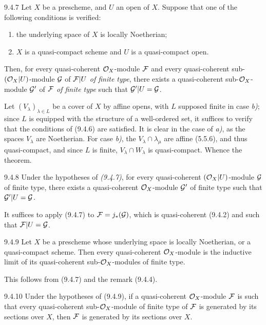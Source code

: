 \documentclass[../main.tex]{subfiles}
\begin{document}
\begin{env}[Theorem]{9.4.7}
    Let $X$ be a prescheme, and $U$ an open of $X$.
    Suppose that one of the following conditions is verified:
    \begin{enumerate}[label=\normalfont\alph*)]
        \item the underlying space of $X$ is locally Noetherian;
        \item $X$ is a quasi-compact scheme and $U$ is a quasi-compact open.
    \end{enumerate}
    Then, for every quasi-coherent $\mathcal{O}_X$-module $\mathcal{F}$ and every quasi-coherent sub-$(\mathcal{O}_X|U)$-module $\mathcal{G}$ of $\mathcal{F}|U$ \emph{of finite type}, there exists a quasi-coherent sub-$\mathcal{O}_X$-module $\mathcal{G}'$ of $\mathcal{F}$ \emph{of finite type} such that $\mathcal{G}'|U=\mathcal{G}$.
\end{env}

Let $(V_\lambda)_{\lambda\in L}$ be a cover of $X$ by affine opens, with $L$ supposed finite in case \emph{b)}; since $L$ is equipped with the structure of a well-ordered set, it suffices to verify that the conditions of (9.4.6) are satisfied.
It is clear in the case of \emph{a)}, as the spaces $V_\lambda$ are Noetherian.
For case \emph{b)}, the $V_\lambda\cap\lambda_\mu$ are affine (5.5.6), and thus quasi-compact, and since $L$ is finite, $V_\lambda\cap W_\lambda$ is quasi-compact.
Whence the theorem.

\begin{env}[Corollary]{9.4.8}
    Under the hypotheses of \emph{(9.4.7)}, for every quasi-coherent $(\mathcal{O}_X|U)$-module $\mathcal{G}$ of finite type, there exists a quasi-coherent $\mathcal{O}_X$-module $\mathcal{G}'$ of finite type such that $\mathcal{G}'|U=\mathcal{G}$.
\end{env}

It suffices to apply (9.4.7) to $\mathcal{F}=j_*(\mathcal{G})$, which is quasi-coherent (9.4.2) and such that $\mathcal{F}|U=\mathcal{G}$.

\begin{env}[Corollary]{9.4.9}
    Let $X$ be a prescheme whose underlying space is locally Noetherian, or a quasi-compact scheme.
    Then every quasi-coherent $\mathcal{O}_X$-module is the inductive limit of its quasi-coherent sub-$\mathcal{O}_X$-modules of finite type.
\end{env}

This follows from (9.4.7) and the remark (9.4.4).

\begin{env}[Corollary]{9.4.10}
    Under the hypotheses of (9.4.9), if a quasi-coherent $\mathcal{O}_X$-module $\mathcal{F}$ is such that every quasi-coherent sub-$\mathcal{O}_X$-module of finite type of $\mathcal{F}$ is generated by its sections over $X$, then $\mathcal{F}$ is generated by its sections over $X$.
\end{env}
\end{document}
